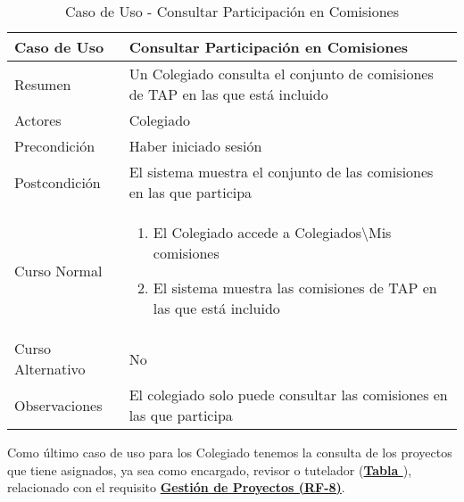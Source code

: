 \begin{table}[!htbp]
  \centering  \addtocounter{casouso}{1}
  \begin{tabular}{|l | p{100mm}|}
    \textbf{Caso de Uso}  & \textbf{Consultar Participación en Comisiones} \\ \hline
    Resumen 		 & Un Colegiado consulta el conjunto de comisiones de TAP en las que está incluido \\ \hline
    Actores  		 & Colegiado \\ \hline
    Precondición  	 & Haber iniciado sesión \\ \hline
    Postcondición  	 & El sistema muestra el conjunto de las comisiones en las que participa \\ \hline
    Curso Normal   	 & \begin{enumerate}
	  \item El Colegiado accede a Colegiados\textbackslash Mis comisiones
	  \item El sistema muestra las comisiones de TAP en las que está incluido
    \end{enumerate}  \\ \hline
    Curso Alternativo  & No  \\ \hline
    Observaciones 	 & El colegiado solo puede consultar las comisiones en las que participa \\ \hline
  \end{tabular}
  \caption{Caso de Uso  - Consultar Participación en Comisiones}
  \label{tab:cucConsultaComision}
\end{table}
\FloatBarrier


\addtocounter{tabla}{1}
Como último caso de uso para los Colegiado tenemos la consulta de los proyectos que tiene asignados, ya sea como encargado, revisor o tutelador (\textbf{\hyperref[tab:cucConsultaProyectos]{Tabla }}), relacionado con el requisito \textbf{\hyperref[tab:rfGestProyectos]{Gestión de Proyectos (RF-8)}}.


